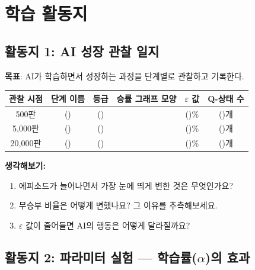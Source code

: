 \documentclass[11pt,a4paper]{article}
\begin{document}
\section{학습 활동지}

\subsection{활동지 1: AI 성장 관찰 일지}

\textbf{목표}: AI가 학습하면서 성장하는 과정을 단계별로 관찰하고 기록한다.

\begin{center}
\renewcommand{\arraystretch}{1.6}
\begin{tabular}{|c|c|c|p{3.5cm}|c|c|}
\hline
\rowcolor{tableheader}
\textbf{관찰 시점} & \textbf{단계 이름} & \textbf{등급} & \textbf{승률 그래프 모양} & \textbf{$\varepsilon$ 값} & \textbf{Q-상태 수} \\
\hline
500판 & (\hspace{1.5cm}) & (\hspace{0.8cm}) & & (\hspace{0.8cm})\% & (\hspace{0.8cm})개 \\
\hline
5,000판 & (\hspace{1.5cm}) & (\hspace{0.8cm}) & & (\hspace{0.8cm})\% & (\hspace{0.8cm})개 \\
\hline
20,000판 & (\hspace{1.5cm}) & (\hspace{0.8cm}) & & (\hspace{0.8cm})\% & (\hspace{0.8cm})개 \\
\hline
\end{tabular}
\end{center}

\textbf{생각해보기:}

\begin{enumerate}
\item 에피소드가 늘어나면서 가장 눈에 띄게 변한 것은 무엇인가요?
\item 무승부 비율은 어떻게 변했나요? 그 이유를 추측해보세요.
\item $\varepsilon$ 값이 줄어들면 AI의 행동은 어떻게 달라질까요?
\end{enumerate}

\subsection{활동지 2: 파라미터 실험 — 학습률($\alpha$)의 효과}
\end{document}
